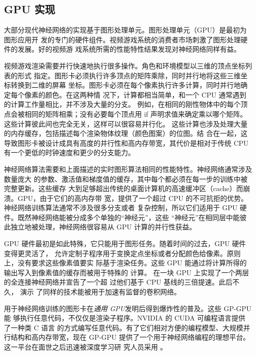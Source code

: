 \subsection{GPU 实现}
\label{subsec:gpu_implementations}

大部分现代神经网络的实现基于图形处理单元。图形处理单元（GPU）是最初为图形应用开
发的专门的硬件组件。视频游戏系统的消费者市场刺激了图形处理硬件的发展。好的视频游
戏系统所需的性能特性结果发现对神经网络同样有益。

视频游戏渲染需要并行快速地执行很多操作。角色和环境模型以三维的顶点坐标列表的形式
指定。图形卡必须执行许多顶点的矩阵乘除，同时并行地将这些三维坐标转换到二维的屏幕
坐标。图形卡必须在每个像素执行许多计算，同时并行地确定每个像素的颜色。在这两种情
况下，计算都相当简单，和一个 CPU 通常遇到的计算工作量相比，并不涉及大量的分支。
例如，在相同的刚性物体中的每个顶点会被相同的矩阵相乘；没有必要每个顶点用 {\serif
  if} 声明求值来确定乘以哪个矩阵。这些计算彼此间也完全无关，这样可以很容易并行化。
这些计算也涉及处理大量的内存缓存，包括描述每个渲染物体纹理（颜色图案）的位图。结
合在一起，这导致图形卡被设计成具有高度的并行性和高内存带宽，其代价是相对于传统
CPU 有一个更低的时钟速度和更少的分支能力。

神经网络算法需要和上面描述的实时图形算法相同的性能特性。神经网络通常涉及数量庞大
的参数、激活值和梯度值的缓存，其中每个都必须在每一步的训练中被完整更新。这些缓存
大到足够超出传统的桌面计算机的高速缓冲区（cache）而崩溃。GPU，由于它们的高内存带
宽，提供了一个超过 CPU 的不可抗拒的优势。神经网络训练算法通常不涉及很多分支或者
复杂控制，所以它们适用于 GPU 硬件。既然神经网络能被分成多个单独的“神经元”，这些
“神经元”在相同层中能彼此独立地被处理，神经网络很容易从 GPU 计算的并行性获益。

GPU 硬件最初是如此特殊，它只能用于图形任务。随着时间的过去，GPU 硬件变得更灵活了，
允许定制子程序用于变换定点坐标或者分配颜色给像素。原则上，没有要求这些像素值要实
际基于渲染任务。这些 GPU 能通过将计算所得的输出写入到像素值的缓存而被用于特殊的
计算。\citet{1575717} 在一块 GPU 上实现了一个两层的全连接神经网络并宣告了一个超
过他们基于 CPU 基线的三倍提速。此后不久，\citet{chellapilla:inria-00112631} 演示
了同样的技术能被用于加速有监督的卷积网络。

用于神经网络训练的图形卡在\emph{通用 GPU}发明后得到爆炸性的普及。这些 GP-GPU 能
够执行任意代码，不仅仅是渲染子程序。NVIDIA 的 CUDA 可编程语言提供了一种类 C 语言
的方式编写任意代码。有了它们相对方便的编程模型、大规模并行结构和高内存带宽，现在
GP-GPU 提供了一个用于神经网络编程的理想平台。这一平台在面世之后迅速被深度学习研
究人员采用 \citep{Raina:2009:LDU:1553374.1553486,Cireşan2012333}。

